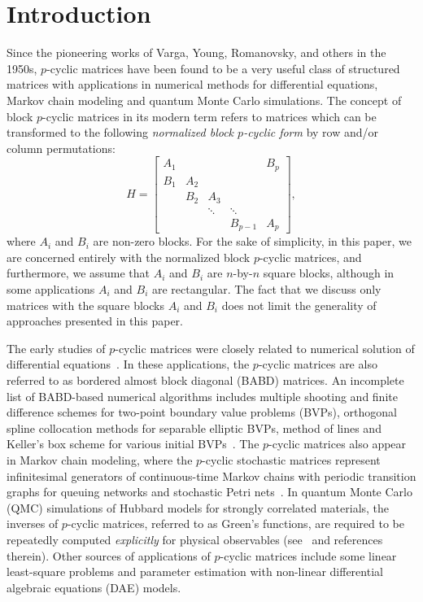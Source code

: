 \documentclass{llncs}
\begin{document}
\section{Introduction}

Since the pioneering works of
Varga, Young, Romanovsky, and others in the 1950s,
$p$-cyclic matrices
have been found to be a very useful class of structured matrices
with applications in numerical methods for differential equations, 
Markov chain modeling and quantum Monte Carlo simulations. 
The concept of block $p$-cyclic matrices
in its modern term refers to matrices which can be
transformed to the following \emph{normalized block $p$-cyclic form} 
by row and/or column permutations: 
\begin{equation} \label{eq:matr_A}
  H =
  \begin{bmatrix}
    A_1 &    &    &  & B_p   \\
    B_1 & A_2 &    &  &  \\
        & B_2 & A_3 &  &     \\
            &        & \ddots & \ddots &         \\
        &     &          & B_{p-1} & A_p
  \end{bmatrix}
  ,
\end{equation}
where $A_i$ and $B_i$ are non-zero blocks.
For the sake of simplicity, in this paper,
we are concerned entirely with the {normalized block $p$-cyclic matrices},
and furthermore, we assume that 
$A_i$ and $B_i$ are $n$-by-$n$ square blocks, although
in some applications $A_i$ and $B_i$ are rectangular.
The fact that we discuss only matrices with the square blocks $A_i$ and $B_i$
does not limit the generality of approaches presented in this paper.

The early studies of $p$-cyclic matrices 
were closely related to numerical solution of differential 
equations~\cite{Wright93,Wright92BSOF,Fairweather04}.
In these applications, the $p$-cyclic matrices are also 
referred to as bordered almost block diagonal 
(BABD) matrices.  An incomplete list of 
BABD-based numerical algorithms includes multiple shooting 
and finite difference schemes for two-point boundary value problems (BVPs),
orthogonal spline collocation methods for separable elliptic BVPs, 
method of lines and Keller's box scheme for various initial 
BVPs~\cite{Wright92BSOF,Fairweather04}.
%
The $p$-cyclic matrices also appear in 
Markov chain modeling, where the $p$-cyclic stochastic 
matrices represent infinitesimal generators of continuous-time 
Markov chains with periodic transition graphs for queuing networks 
and stochastic Petri nets~\cite{Ernst00}.
%
In quantum Monte Carlo (QMC) simulations of Hubbard models for
strongly correlated materials,
the inverses of $p$-cyclic matrices, referred to as Green's functions, 
are required to be repeatedly computed {\em explicitly} for 
physical observables (see~\cite{Bai09,Tomas12} and references therein).
Other sources of applications of $p$-cyclic matrices include
some linear least-square problems and parameter estimation with 
non-linear differential algebraic equations (DAE) models.
\end{document}
